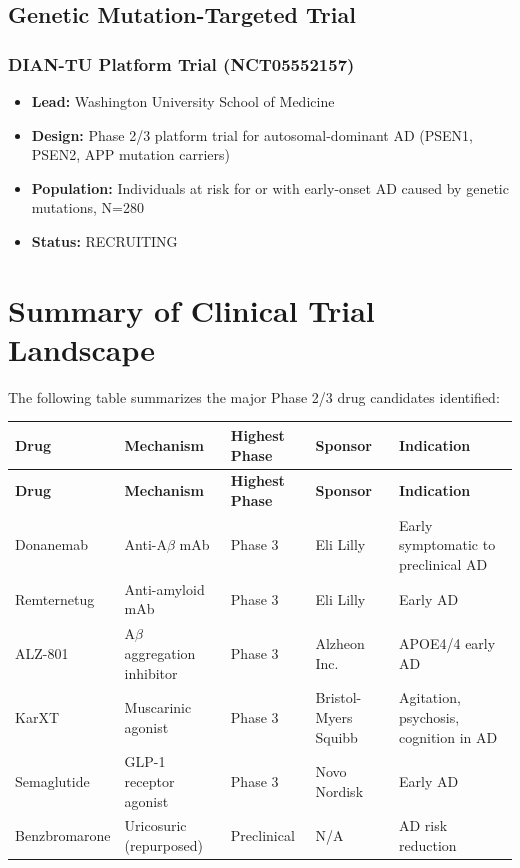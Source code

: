 \documentclass[11pt, a4paper]{article}
\begin{document}
\subsection{Genetic Mutation-Targeted Trial}

\subsubsection{DIAN-TU Platform Trial (NCT05552157)}
\begin{itemize}
    \item \textbf{Lead:} Washington University School of Medicine
    \item \textbf{Design:} Phase 2/3 platform trial for autosomal-dominant AD (PSEN1, PSEN2, APP mutation carriers)
    \item \textbf{Population:} Individuals at risk for or with early-onset AD caused by genetic mutations, N=280
    \item \textbf{Status:} RECRUITING
\end{itemize}

\section{Summary of Clinical Trial Landscape}
\label{sec:trials}

The following table summarizes the major Phase 2/3 drug candidates identified:

\begin{longtable}{p{3cm} p{2.5cm} p{2.5cm} p{2.5cm} p{3cm}}
\toprule
\textbf{Drug} & \textbf{Mechanism} & \textbf{Highest Phase} & \textbf{Sponsor} & \textbf{Indication} \\
\midrule
\endfirsthead
\toprule
\textbf{Drug} & \textbf{Mechanism} & \textbf{Highest Phase} & \textbf{Sponsor} & \textbf{Indication} \\
\midrule
\endhead
\bottomrule
\endfoot
Donanemab & Anti-A$\beta$ mAb & Phase 3 & Eli Lilly & Early symptomatic to preclinical AD \\
Remternetug & Anti-amyloid mAb & Phase 3 & Eli Lilly & Early AD \\
ALZ-801 & A$\beta$ aggregation inhibitor & Phase 3 & Alzheon Inc. & APOE4/4 early AD \\
KarXT & Muscarinic agonist & Phase 3 & Bristol-Myers Squibb & Agitation, psychosis, cognition in AD \\
Semaglutide & GLP-1 receptor agonist & Phase 3 & Novo Nordisk & Early AD \\
Benzbromarone & Uricosuric (repurposed) & Preclinical & N/A & AD risk reduction \\
\bottomrule
\end{longtable}
\end{document}
